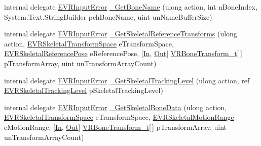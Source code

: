 \begin{DoxyCompactItemize}
\item 
internal delegate \mbox{\hyperlink{namespace_valve_1_1_v_r_a592d7f4189b8346d6c96dbdbaa35bc1b}{E\+V\+R\+Input\+Error}} \mbox{\hyperlink{struct_valve_1_1_v_r_1_1_i_v_r_input_ab946688fdae1876df1fa3c06426579cf}{\+\_\+\+Get\+Bone\+Name}} (ulong action, int n\+Bone\+Index, System.\+Text.\+String\+Builder pch\+Bone\+Name, uint un\+Name\+Buffer\+Size)
\item 
internal delegate \mbox{\hyperlink{namespace_valve_1_1_v_r_a592d7f4189b8346d6c96dbdbaa35bc1b}{E\+V\+R\+Input\+Error}} \mbox{\hyperlink{struct_valve_1_1_v_r_1_1_i_v_r_input_a1d1f340254e37a3037714eb5ee548afd}{\+\_\+\+Get\+Skeletal\+Reference\+Transforms}} (ulong action, \mbox{\hyperlink{namespace_valve_1_1_v_r_a916744fb3fc7b8e8ba224fba9bee6de4}{E\+V\+R\+Skeletal\+Transform\+Space}} e\+Transform\+Space, \mbox{\hyperlink{namespace_valve_1_1_v_r_a299b655881f873256f035349b59da09e}{E\+V\+R\+Skeletal\+Reference\+Pose}} e\+Reference\+Pose, \mbox{[}\mbox{\hyperlink{namespace_valve_1_1_v_r_a1e6192cb5ddaf204afab87ccb5728780aefeb369cccbd560588a756610865664c}{In}}, \mbox{\hyperlink{namespace_valve_1_1_v_r_a1e6192cb5ddaf204afab87ccb5728780a7c147cda9e49590f6abe83d118b7353b}{Out}}\mbox{]} \mbox{\hyperlink{struct_valve_1_1_v_r_1_1_v_r_bone_transform__t}{V\+R\+Bone\+Transform\+\_\+t}}\mbox{[}$\,$\mbox{]} p\+Transform\+Array, uint un\+Transform\+Array\+Count)
\item 
internal delegate \mbox{\hyperlink{namespace_valve_1_1_v_r_a592d7f4189b8346d6c96dbdbaa35bc1b}{E\+V\+R\+Input\+Error}} \mbox{\hyperlink{struct_valve_1_1_v_r_1_1_i_v_r_input_a0521ebd1a374c8e54ca2864d7b6d57eb}{\+\_\+\+Get\+Skeletal\+Tracking\+Level}} (ulong action, ref \mbox{\hyperlink{namespace_valve_1_1_v_r_a6f46bd50fb65255d6537ab32a6bddc30}{E\+V\+R\+Skeletal\+Tracking\+Level}} p\+Skeletal\+Tracking\+Level)
\item 
internal delegate \mbox{\hyperlink{namespace_valve_1_1_v_r_a592d7f4189b8346d6c96dbdbaa35bc1b}{E\+V\+R\+Input\+Error}} \mbox{\hyperlink{struct_valve_1_1_v_r_1_1_i_v_r_input_a51bb3d46fb9a17ce1918475f0e1f0f3f}{\+\_\+\+Get\+Skeletal\+Bone\+Data}} (ulong action, \mbox{\hyperlink{namespace_valve_1_1_v_r_a916744fb3fc7b8e8ba224fba9bee6de4}{E\+V\+R\+Skeletal\+Transform\+Space}} e\+Transform\+Space, \mbox{\hyperlink{namespace_valve_1_1_v_r_affc8d18345f8f5d36f1ae7b4ce534500}{E\+V\+R\+Skeletal\+Motion\+Range}} e\+Motion\+Range, \mbox{[}\mbox{\hyperlink{namespace_valve_1_1_v_r_a1e6192cb5ddaf204afab87ccb5728780aefeb369cccbd560588a756610865664c}{In}}, \mbox{\hyperlink{namespace_valve_1_1_v_r_a1e6192cb5ddaf204afab87ccb5728780a7c147cda9e49590f6abe83d118b7353b}{Out}}\mbox{]} \mbox{\hyperlink{struct_valve_1_1_v_r_1_1_v_r_bone_transform__t}{V\+R\+Bone\+Transform\+\_\+t}}\mbox{[}$\,$\mbox{]} p\+Transform\+Array, uint un\+Transform\+Array\+Count)

\end{DoxyCompactItemize}
